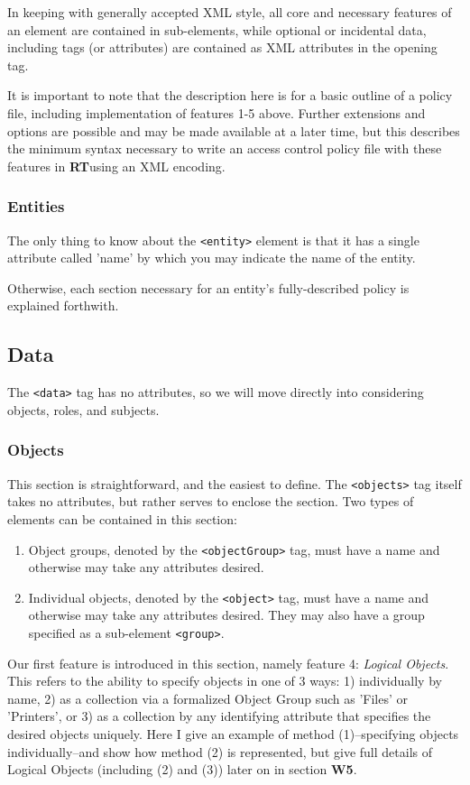 \documentclass{article}
\providecommand{\tightlist}{
    \setlength{\itemsep}{1pt}\setlength{\parskip}{0pt}
}
\providecommand{\inlinecode}{\texttt}
\providecommand{\RT}{\textbf{RT}}
\begin{document}
In keeping with generally accepted XML style, all core and necessary features of an element are contained in sub-elements, while optional or incidental data, including tags (or attributes) are contained as XML attributes in the opening tag. \par

It is important to note that the description here is for a basic outline of a policy file, including implementation of features 1-5 above. Further extensions and options are possible and may be made available at a later time, but this describes the minimum syntax necessary to write an access control policy file with these features in \RT using an XML encoding.

\subsubsection{Entities}
The only thing to know about the \inlinecode{<entity>} element is that it has a single attribute called 'name' by which you may indicate the name of the entity. \par

Otherwise, each section necessary for an entity's fully-described policy is explained forthwith.

\subsection{Data}
The \inlinecode{<data>} tag has no attributes, so we will move directly into considering objects, roles, and subjects.
\subsubsection{Objects}
This section is straightforward, and the easiest to define.
The \inlinecode{<objects>} tag itself takes no attributes, but rather serves to enclose the section. Two types of elements can be contained in this section:
\begin{enumerate}\tightlist
  \item Object groups, denoted by the \inlinecode{<objectGroup>} tag, must have a name and otherwise may take any attributes desired.
  \item Individual objects, denoted by the \inlinecode{<object>} tag, must have a name and otherwise may take any attributes desired. They may also have a group specified as a sub-element \inlinecode{<group>}.
\end{enumerate}

Our first feature is introduced in this section, namely feature 4: \textit{Logical Objects}. This refers to the ability to specify objects in one of 3 ways: 1) individually by name, 2) as a collection via a formalized Object Group such as 'Files' or 'Printers', or 3) as a collection by any identifying attribute that specifies the desired objects uniquely.
Here I give an example of method (1)--specifying objects individually--and show how method (2) is represented, but give full details of Logical Objects (including (2) and (3)) later on in section \textbf{W5}.
\end{document}

